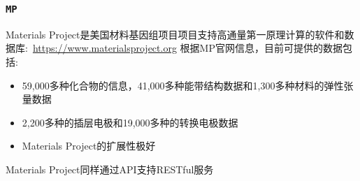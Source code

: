 \frame
{
\frametitle{\tt{MP}}
\textrm{Materials Project}是美国材料基因组项目项目支持高通量第一原理计算的软件和数据库:~\url{https://www.materialsproject.org}%
\vskip 2pt
{\fontsize{8.5pt}{4.2pt}}
\vskip 3pt
根据\textrm{MP}官网信息，目前可提供的数据包括:
\begin{itemize}
	\item \textrm{59,000}多种化合物的信息，\textrm{41,000}多种能带结构数据和\textrm{1,300}多种材料的弹性张量数据
	\item \textrm{2,200}多种\textrm{}的插层电极和\textrm{19,000}多种\textrm{}的转换电极数据
	\item \textrm{Materials Project}的扩展性极好\\
		{\fontsize{8.0pt}{4.2pt}}%
\end{itemize}

\textrm{Materials Project}同样通过\textrm{API}支持\textrm{RESTful}服务%
}

